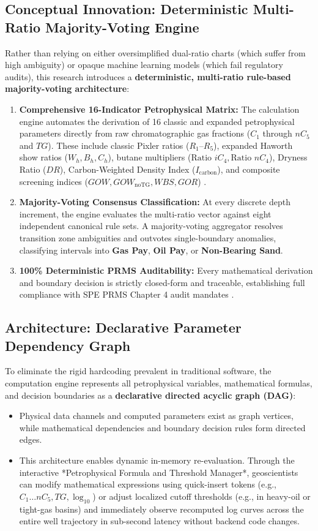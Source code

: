 \subsection{Conceptual Innovation: Deterministic Multi-Ratio Majority-Voting Engine}
Rather than relying on either oversimplified dual-ratio charts (which suffer from high ambiguity) or opaque machine learning models (which fail regulatory audits), this research introduces a \textbf{deterministic, multi-ratio rule-based majority-voting architecture}:
\begin{enumerate}
    \item \textbf{Comprehensive 16-Indicator Petrophysical Matrix:} The calculation engine automates the derivation of 16 classic and expanded petrophysical parameters directly from raw chromatographic gas fractions ($C_1$ through $nC_5$ and $TG$). These include classic Pixler ratios ($R_1$--$R_5$), expanded Haworth show ratios ($W_h, B_h, C_h$), butane multipliers ($\text{Ratio } iC_4, \text{Ratio } nC_4$), Dryness Ratio ($DR$), Carbon-Weighted Density Index ($I_{\text{carbon}}$), and composite screening indices ($GOW, GOW_{\text{noTG}}, WBS, GOR$) \citep{ref13, haworth1985, whittaker1991, spe2020}.
    \item \textbf{Majority-Voting Consensus Classification:} At every discrete depth increment, the engine evaluates the multi-ratio vector against eight independent canonical rule sets. A majority-voting aggregator resolves transition zone ambiguities and outvotes single-boundary anomalies, classifying intervals into \textbf{Gas Pay}, \textbf{Oil Pay}, or \textbf{Non-Bearing Sand}.
    \item \textbf{100\% Deterministic PRMS Auditability:} Every mathematical derivation and boundary decision is strictly closed-form and traceable, establishing full compliance with SPE PRMS Chapter 4 audit mandates \citep{ref2, ref3}.
\end{enumerate}

\subsection{Architecture: Declarative Parameter Dependency Graph}
To eliminate the rigid hardcoding prevalent in traditional software, the computation engine represents all petrophysical variables, mathematical formulas, and decision boundaries as a \textbf{declarative directed acyclic graph (DAG)}:
\begin{itemize}
    \item Physical data channels and computed parameters exist as graph vertices, while mathematical dependencies and boundary decision rules form directed edges.
    \item This architecture enables dynamic in-memory re-evaluation. Through the interactive *Petrophysical Formula and Threshold Manager*, geoscientists can modify mathematical expressions using quick-insert tokens (e.g., $C_1 \dots nC_5, TG, \log_{10}$) or adjust localized cutoff thresholds (e.g., in heavy-oil or tight-gas basins) and immediately observe recomputed log curves across the entire well trajectory in sub-second latency without backend code changes.
\end{itemize}

